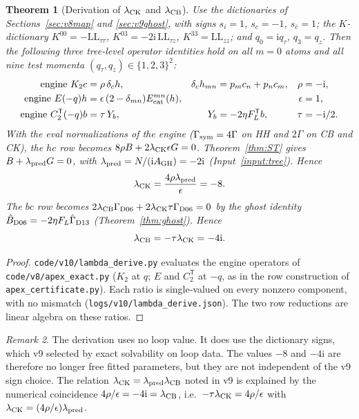 \documentclass[11pt,a4paper]{article}
\newcommand{\ii}{\mathrm i}
\newcommand{\loc}[1]{\nolinkurl{#1}}
\theoremstyle{plain}
\newtheorem{theorem}{Theorem}[section]
\theoremstyle{definition}
\theoremstyle{remark}
\newtheorem{remark}[theorem]{Remark}
\numberwithin{equation}{section}
\begin{document}
\begin{theorem}[Derivation of \(\lambda_{\rm CK}\) and \(\lambda_{\rm CB}\)]
\label{thm:v10lambda}
Use the dictionaries of Sections~\ref{sec:v8map} and
\ref{sec:v9ghost}, with signs \(s_i=1\), \(s_c=-1\), \(s_{\bar c}=1\);
the \(K\)-dictionary \(K^{00}=-\mathrm{LL}_{\tau\tau}\),
\(K^{03}=-2\ii\,\mathrm{LL}_{\tau z}\),
\(K^{33}=\mathrm{LL}_{zz}\); and \(q_0=\ii q_\tau\), \(q_3=q_z\).
Then the following three tree-level operator identities hold on all
\(m=0\) atoms and all nine test momenta \((q_\tau,q_z)\in\{1,2,3\}^2\):
\begin{align*}
 \text{engine }K_2c&=\rho\,\delta_ch,& \delta_ch_{mn}&=p_mc_n+p_nc_m, & \rho&=-\ii,\\
 \text{engine }E(-q)h&=\epsilon\,(2-\delta_{mn})E^{mn}_{\rm cat}(h), && & \epsilon&=1,\\
 \text{engine }C_2^{\mathsf T}(-q)b&=\tau\,Y_b, & Y_b&=-2\eta F_L^{\mathsf T}b, & \tau&=-\ii/2 .
\end{align*}
With the eval normalizations of the engine (\(\Gamma_{\rm sym}=4\Gamma\)
on HH and \(2\Gamma\) on CB and CK), the \(hc\) row becomes
\(8\rho B+2\lambda_{\rm CK}\epsilon G=0\). Theorem~\ref{thm:ST}
gives \(B+\lambda_{\rm pred}G=0\), with
\(\lambda_{\rm pred}=N/(\ii A_{\rm GH})=-2\ii\)
(Input~\ref{input:tree}). Hence
\[
 \lambda_{\rm CK}=\frac{4\rho\lambda_{\rm pred}}{\epsilon}=-8 .
\]
The \(b c\) row becomes
\(2\lambda_{\rm CB}\Gamma_{\rm D06}+2\lambda_{\rm CK}\tau\Gamma_{\rm D06}=0\)
by the ghost identity
\(\hat B_{\rm D06}=-2\eta F_L\hat\Gamma_{\rm D13}\)
(Theorem~\ref{thm:ghost}). Hence
\[
 \lambda_{\rm CB}=-\tau\lambda_{\rm CK}=-4\ii .
\]
\end{theorem}

\begin{proof}
\loc{code/v10/lambda_derive.py} evaluates the engine operators of
\loc{code/v8/apex_exact.py} (\(K_2\) at \(q\); \(E\) and
\(C_2^{\mathsf T}\) at \(-q\), as in the row construction of
\loc{apex_certificate.py}). Each ratio is single-valued on every
nonzero component, with no mismatch
(\loc{logs/v10/lambda_derive.json}). The two row reductions are
linear algebra on these ratios.
\end{proof}

\begin{remark}
The derivation uses no loop value. It does use the dictionary
signs, which v9 selected by exact solvability on loop data. The
values \(-8\) and \(-4\ii\) are therefore no longer free fitted
parameters, but they are not independent of the v9 sign choice.
The relation \(\lambda_{\rm CK}=\lambda_{\rm pred}\lambda_{\rm CB}\)
noted in v9 is explained by the numerical coincidence
\(4\rho/\epsilon=-4\ii=\lambda_{\rm CB}\), i.e.\ \(-\tau\lambda_{\rm CK}=4\rho/\epsilon\) with
\(\lambda_{\rm CK}=(4\rho/\epsilon)\lambda_{\rm pred}\).
\end{remark}
\end{document}
